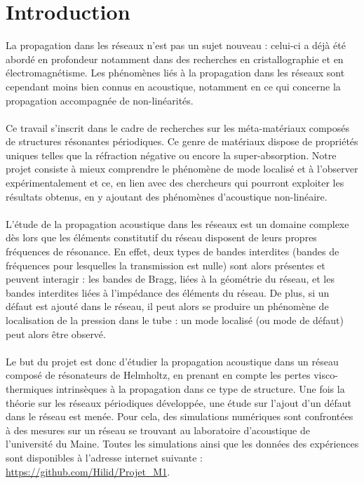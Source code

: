 \chapter*{Introduction}


La propagation dans les réseaux n'est pas un sujet nouveau : celui-ci a déjà été abordé en profondeur notamment dans des recherches en cristallographie et en électromagnétisme. Les phénomènes liés à la propagation dans les réseaux sont cependant moins bien connus en acoustique, notamment en ce qui concerne la propagation accompagnée de non-linéarités.\\~\\


Ce travail s'inscrit dans le cadre de recherches sur les méta-matériaux composés de structures résonantes périodiques. Ce genre de matériaux dispose de propriétés uniques telles que la réfraction négative ou encore la super-absorption. Notre projet consiste à mieux comprendre le phénomène de mode localisé et à l'observer expérimentalement et ce, en lien avec des chercheurs qui pourront exploiter les résultats obtenus, en y ajoutant des phénomènes d'acoustique non-linéaire.\\~\\


L'étude de la propagation acoustique dans les réseaux est un domaine complexe dès lors que les éléments constitutif du réseau disposent de leurs propres fréquences de résonance. En effet, deux types de bandes interdites (bandes de fréquences pour lesquelles la transmission est nulle) sont alors présentes et peuvent interagir : les bandes de Bragg, liées à la géométrie du réseau, et les bandes interdites liées à l'impédance des éléments du réseau. De plus, si un défaut est ajouté dans le réseau, il peut alors se produire un phénomène de localisation de la pression dans le tube : un mode localisé (ou mode de défaut) peut alors être observé. \\~\\


Le but du projet est donc d'étudier la propagation acoustique dans un réseau composé de résonateurs de Helmholtz, en prenant en compte les pertes visco-thermiques intrinsèques à la propagation dans ce type de structure. Une fois la théorie sur les réseaux périodiques développée, une étude sur l'ajout d'un défaut dans le réseau est menée. Pour cela, des simulations numériques sont confrontées à des mesures sur un réseau se trouvant au laboratoire d'acoustique de l'université du Maine. Toutes les simulations ainsi que les données des expériences sont disponibles à l'adresse internet suivante : \url{https://github.com/Hilid/Projet_M1}.
